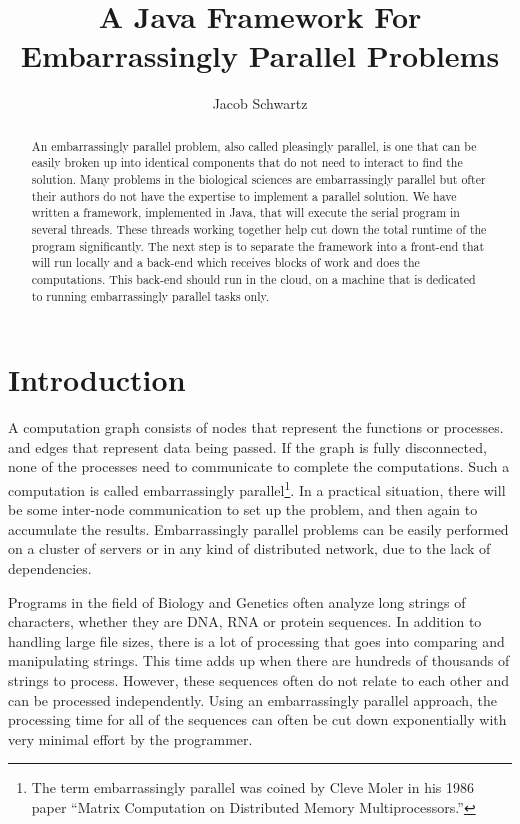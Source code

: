 \documentclass[12pt]{article}
\begin{document}
\title{A Java Framework For Embarrassingly Parallel Problems}
\author{Jacob Schwartz}
\maketitle

\begin{abstract}
An embarrassingly parallel problem, also called pleasingly parallel, is one that
can be easily broken up into identical components that do not need to interact
to find the solution. Many problems in the biological sciences are 
embarrassingly parallel but ofter their authors do not have the expertise to
implement a parallel solution. We have written a framework, implemented in Java,
that will execute the serial program in several threads. These threads working
together help cut down the total runtime of the program significantly. The next
step is to separate the framework into a front-end that will run locally and a
back-end which receives blocks of work and does the computations. This back-end
should run in the cloud, on a machine that is dedicated to running
embarrassingly parallel tasks only.
\end{abstract}

\section{Introduction}

A computation graph consists of nodes that represent the functions or processes.
and edges that represent data being passed. If the graph is fully disconnected,
none of the processes need to communicate to complete the computations. Such a
computation is called embarrassingly parallel\footnote{The term embarrassingly
parallel was coined by Cleve Moler in his 1986 paper ``Matrix Computation on
Distributed Memory Multiprocessors.''}. In a practical situation, there will be
some inter-node communication to set up the problem, and then again to
accumulate the results.  Embarrassingly parallel problems can be easily
performed on a cluster of servers or in any kind of distributed network, due to
the lack of dependencies. 

Programs in the field of Biology and Genetics often analyze long strings of
characters, whether they are DNA, RNA or protein sequences. In addition to
handling large file sizes, there is a lot of processing that goes into comparing
and manipulating strings. This time adds up when there are hundreds of thousands
of strings to process. However, these sequences often do not relate to each
other and can be processed independently. Using an embarrassingly parallel
approach, the processing time for all of the sequences can often be cut down
exponentially with very minimal effort by the programmer.
\end{document}
